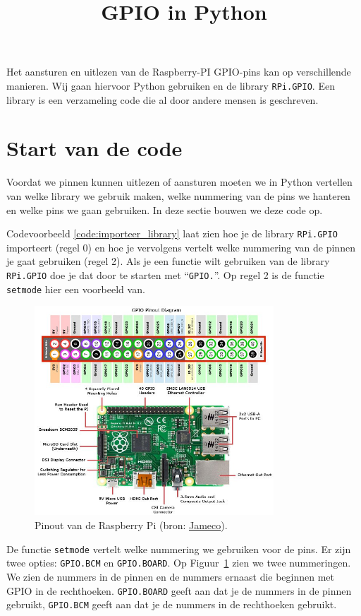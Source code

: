 \documentclass{guide}
\title{GPIO in Python}
\begin{document}
Het aansturen en uitlezen van de Raspberry-PI GPIO-pins kan op verschillende manieren. Wij gaan hiervoor Python gebruiken en de library \texttt{RPi.GPIO}. Een library is een verzameling code die al door andere mensen is geschreven.

\section{Start van de code}
\label{sec:start_code}
Voordat we pinnen kunnen uitlezen of aansturen moeten we in Python vertellen van welke library we gebruik maken, welke nummering van de pins we hanteren en welke pins we gaan gebruiken. In deze sectie bouwen we deze code op.

Codevoorbeeld \ref{code:importeer_library} laat zien hoe je de library \texttt{RPi.GPIO} importeert (regel 0) en hoe je vervolgens vertelt welke nummering van de pinnen je gaat gebruiken (regel 2). Als je een functie wilt gebruiken van de library \texttt{RPi.GPIO} doe je dat door te starten met \enquote{\texttt{GPIO.}}. Op regel 2 is de functie \texttt{setmode} hier een voorbeeld van.

\begin{figure}[h]
  \centering
  \includegraphics[width=0.8\textwidth]{images/pinout.png}
  \caption{Pinout van de Raspberry Pi (bron: \href{https://www.jameco.com/Jameco/workshop/circuitnotes/raspberry-pi-circuit-note.html}{Jameco}).} \label{fig:pinout}
\end{figure}

De functie \texttt{setmode} vertelt welke nummering we gebruiken voor de pins. Er zijn twee opties: \texttt{GPIO.BCM} en \texttt{GPIO.BOARD}. Op Figuur~\ref{fig:pinout} zien we twee nummeringen. We zien de nummers in de pinnen en de nummers ernaast die beginnen met GPIO in de rechthoeken. \texttt{GPIO.BOARD} geeft aan dat je de nummers in de pinnen gebruikt, \texttt{GPIO.BCM} geeft aan dat je de nummers in de rechthoeken gebruikt.
\end{document}
